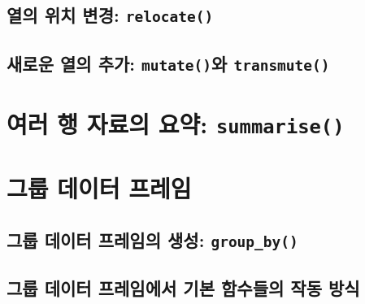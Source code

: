 \documentclass[
]{book}
\begin{document}
\hypertarget{uxc5f4uxc758-uxc704uxce58-uxbcc0uxacbd-relocate}{%
\subsection{\texorpdfstring{열의 위치 변경: \texttt{relocate()}}{열의 위치 변경: relocate()}}\label{uxc5f4uxc758-uxc704uxce58-uxbcc0uxacbd-relocate}}

\hypertarget{uxc0c8uxb85cuxc6b4-uxc5f4uxc758-uxcd94uxac00-mutateuxc640-transmute}{%
\subsection{\texorpdfstring{새로운 열의 추가: \texttt{mutate()}와 \texttt{transmute()}}{새로운 열의 추가: mutate()와 transmute()}}\label{uxc0c8uxb85cuxc6b4-uxc5f4uxc758-uxcd94uxac00-mutateuxc640-transmute}}

\hypertarget{uxc5ecuxb7ec-uxd589-uxc790uxb8ccuxc758-uxc694uxc57d-summarise}{%
\section{\texorpdfstring{여러 행 자료의 요약: \texttt{summarise()}}{여러 행 자료의 요약: summarise()}}\label{uxc5ecuxb7ec-uxd589-uxc790uxb8ccuxc758-uxc694uxc57d-summarise}}

\hypertarget{uxadf8uxb8f9-uxb370uxc774uxd130-uxd504uxb808uxc784}{%
\section{그룹 데이터 프레임}\label{uxadf8uxb8f9-uxb370uxc774uxd130-uxd504uxb808uxc784}}

\hypertarget{uxadf8uxb8f9-uxb370uxc774uxd130-uxd504uxb808uxc784uxc758-uxc0dduxc131-group_by}{%
\subsection{\texorpdfstring{그룹 데이터 프레임의 생성: \texttt{group\_by()}}{그룹 데이터 프레임의 생성: group\_by()}}\label{uxadf8uxb8f9-uxb370uxc774uxd130-uxd504uxb808uxc784uxc758-uxc0dduxc131-group_by}}

\hypertarget{uxadf8uxb8f9-uxb370uxc774uxd130-uxd504uxb808uxc784uxc5d0uxc11c-uxae30uxbcf8-uxd568uxc218uxb4e4uxc758-uxc791uxb3d9-uxbc29uxc2dd}{%
\subsection{그룹 데이터 프레임에서 기본 함수들의 작동 방식}\label{uxadf8uxb8f9-uxb370uxc774uxd130-uxd504uxb808uxc784uxc5d0uxc11c-uxae30uxbcf8-uxd568uxc218uxb4e4uxc758-uxc791uxb3d9-uxbc29uxc2dd}}
\end{document}
